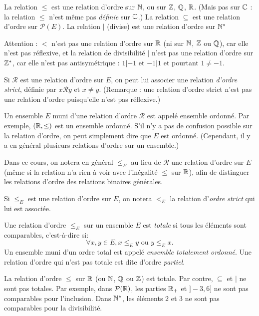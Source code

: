 \begin{exemples}
La relation $\leq$ est une relation d'ordre sur $\mathbb{N}$, ou sur $\mathbb{Z}$, $\mathbb{Q}$, $\mathbb{R}$. (Mais pas sur $\mathbb{C}$ : la relation $\leq$ n'est même pas \emph{définie} sur $\mathbb{C}$.)
La relation $\subseteq$ est une relation d'ordre sur $\mathcal P(E)$.
La relation $|$ (\og divise\fg) est une relation d'ordre sur $\mathbb{N}^*$
\end{exemples}

Attention : $<$ n'est pas une relation d'ordre sur $\mathbb{R}$ (ni sur $\mathbb{N}$, $\mathbb{Z}$ ou $\mathbb{Q}$), car elle n'est pas réflexive, et la relation de divisibilité $|$ n'est pas une relation d'ordre sur $\mathbb{Z}^*$, car elle n'est pas antisymétrique : $1|-1$ et $-1|1$ et pourtant $1\neq -1$.

\begin{definition}
Si ${\mathcal R}$ est une relation d'ordre sur $E$, on peut lui associer une relation \emph{d'ordre strict}, définie par \og$ x{\mathcal R}y\text{ et }x\neq y$\fg. (Remarque : une relation d'ordre strict n'est pas une relation d'ordre puisqu'elle n'est pas réflexive.)
\end{definition}

Un ensemble $E$ muni d'une relation d'ordre ${\mathcal R}$ est appelé ensemble ordonné. Par exemple, $(\mathbb{R}, \leq)$ est un ensemble ordonné. S'il n'y a pas de confusion possible sur la relation d'ordre, on peut simplement dire que $E$ est ordonné. (Cependant, il y a en général plusieurs relations d'ordre sur un ensemble.)

Dans ce cours, on notera en général $\leq_E$ au lieu de ${\mathcal R}$ une relation d'ordre sur $E$ (même si la relation n'a rien à voir avec l'inégalité $\leq$ sur $\mathbb{R}$), afin de distinguer les relations d'ordre des relations binaires générales.

Si $\leq_E$ est une relation d'ordre sur $E$, on notera $<_E$ la relation d'\emph{ordre strict} qui lui est associée.


\begin{definition}
Une relation d'ordre $\leq_E$ sur un ensemble $E$ est \emph{totale} si tous les éléments sont comparables, c'est-à-dire si:
\[ \forall x, y\in E, x\leq_Ey\text{ ou } y\leq_E x.\]
Un ensemble muni d'un ordre total est appelé \emph{ensemble totalement ordonné}. Une relation d'ordre qui n'est pas totale est dite d'ordre \emph{partiel}.
\end{definition}

\begin{exemples}
La relation d'ordre $\leq$ sur $\mathbb{R}$ (ou $\mathbb{N}$, $\mathbb{Q}$ ou  $\mathbb{Z}$) est totale. Par contre, $\subseteq$ et $|$ ne sont pas totales. Par exemple, dans $\mathcal P(\mathbb{R})$, les parties $\mathbb{R}_+$ et $]-3,6]$ ne sont pas comparables pour l'inclusion. Dans $\mathbb{N}^*$, les éléments $2$ et $3$ ne sont pas comparables pour la divisibilité.
\end{exemples}

